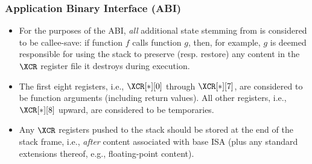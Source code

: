 
\subsubsection{Application Binary Interface (ABI)}
\label{sec:spec:state:abi}

\begin{itemize}
\item For the purposes of the ABI, {\em all} additional state stemming from 
      \XCID is considered to be callee-save: if function $f$ calls function
      $g$, then, for example, $g$ is deemed responsible for using the stack
      to preserve (resp. restore) any content in the $\XCR$ register file 
      it destroys during execution.
\item The first eight registers, 
      i.e., $\XCR[*][0]$ through $\XCR[*][7]$, 
      are considered to be function arguments (including return values).
      All other registers, 
      i.e., $\XCR[*][8]$ upward,
      are considered to be temporaries.
\item Any $\XCR$ registers pushed to the stack should be stored 
      at the end of the stack frame, 
      i.e., {\em after} content associated with base ISA (plus any standard 
      extensions thereof, e.g., floating-point content).
\end{itemize}

